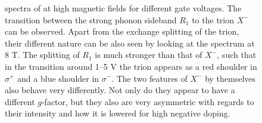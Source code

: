 \begin{figure}[t]
\begin{subfigure}{0.32\textwidth}
	\end{subfigure}
	\caption{\pl spectra of \wse at high magnetic fields for different gate voltages. The transition between the strong phonon sideband $R_1$ to the trion $X^-$ can be observed. Apart from the exchange splitting of the trion, their different nature can be also seen by looking at the spectrum at 8 T. The splitting of $R_1$ is much stronger than that of $X^-$, such that in the transition around 1--5 V the trion appears as a red shoulder in $\sigma^+$ and a blue shoulder in $\sigma^-$. The two features of $X^-$ by themselves also behave very differently. Not only do they appear to have a different $g$-factor, but they also are very asymmetric with regards to their intensity and how it is lowered for high negative doping.}\label{waterfall}
\end{figure}

